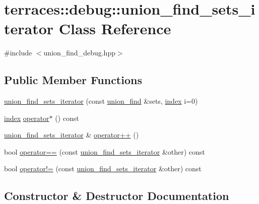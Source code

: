 \hypertarget{classterraces_1_1debug_1_1union__find__sets__iterator}{}\section{terraces\+:\+:debug\+:\+:union\+\_\+find\+\_\+sets\+\_\+iterator Class Reference}
\label{classterraces_1_1debug_1_1union__find__sets__iterator}


{\ttfamily \#include $<$union\+\_\+find\+\_\+debug.\+hpp$>$}

\subsection*{Public Member Functions}
\begin{DoxyCompactItemize}
\item 
\hyperlink{classterraces_1_1debug_1_1union__find__sets__iterator_ae28374a3f0c611187a6bf4ad8438c798}{union\+\_\+find\+\_\+sets\+\_\+iterator} (const \hyperlink{classterraces_1_1union__find}{union\+\_\+find} \&sets, \hyperlink{namespaceterraces_adbc33ccb543d1634e96d0eb02e472c77}{index} i=0)
\item 
\hyperlink{namespaceterraces_adbc33ccb543d1634e96d0eb02e472c77}{index} \hyperlink{classterraces_1_1debug_1_1union__find__sets__iterator_a48e63857f3946425a716ab626c2414ae}{operator$\ast$} () const
\item 
\hyperlink{classterraces_1_1debug_1_1union__find__sets__iterator}{union\+\_\+find\+\_\+sets\+\_\+iterator} \& \hyperlink{classterraces_1_1debug_1_1union__find__sets__iterator_a8f020f83b8692207b4b69ba3e3b69828}{operator++} ()
\item 
bool \hyperlink{classterraces_1_1debug_1_1union__find__sets__iterator_a9e8708a0c9ed133d5615723afa719b19}{operator==} (const \hyperlink{classterraces_1_1debug_1_1union__find__sets__iterator}{union\+\_\+find\+\_\+sets\+\_\+iterator} \&other) const
\item 
bool \hyperlink{classterraces_1_1debug_1_1union__find__sets__iterator_a7dbbf2426e076bd011e78760611c6b8b}{operator!=} (const \hyperlink{classterraces_1_1debug_1_1union__find__sets__iterator}{union\+\_\+find\+\_\+sets\+\_\+iterator} \&other) const
\end{DoxyCompactItemize}


\subsection{Constructor \& Destructor Documentation}
\mbox{\label{classterraces_1_1debug_1_1union__find__sets__iterator_ae28374a3f0c611187a6bf4ad8438c798}} 
